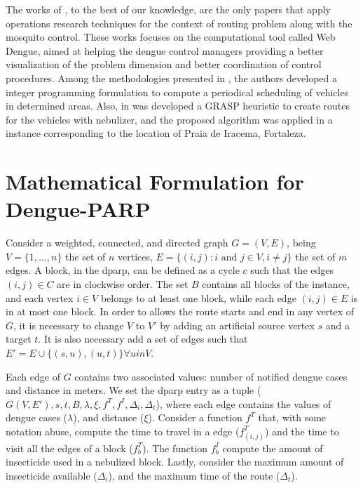 \documentclass[a4paper,11pt]{article}
\begin{document}
The works of \cite{negreiros:2008,negreiros:2011,negreiros-2020}, to the best of
our knowledge, are the only papers that apply operations research techniques for
the context  of routing  problem along  with the  mosquito control.  These works
focuses on the computational tool called Web Dengue, aimed at helping the dengue
control managers providing  a better visualization of the  problem dimension and
better coordination of control procedures.  Among the methodologies presented in
\cite{negreiros:2008,negreiros:2011},   the   authors    developed   a   integer
programming  formulation  to compute  a  periodical  scheduling of  vehicles  in
determined areas. Also, in \cite{negreiros:2011} was developed a GRASP heuristic
to create routes for the vehicles with nebulizer, and the proposed algorithm was
applied  in a  instance  corresponding  to the  location  of  Praia de  Iracema,
Fortaleza.

\section{Mathematical Formulation for Dengue-PARP} \label{sec:formulation}

Consider a weighted, connected, and directed graph $G = (V, E)$, being $V = \{1,
\dots, n\}$ the  set of $n$ vertices, $E =  \{(i, j): i \text{ and }  j \in V, i
\neq j\}$ the set of $m$ edges. A block, in the \gls{dparp}, can be defined as a
cycle $c$ such that the edges $(i, j) \in C$ are in clockwise order. The set $B$
contains all  blocks of the instance,  and each vertex  $i \in V$ belongs  to at
least one  block, while each  edge $(i, j)  \in E$ is in  at most one  block. In
order to allows the  route starts and end in any vertex of  $G$, it is necessary
to change  $V$ to $V'$ by  adding an artificial  source vertex $s$ and  a target
$t$. It is  also necessary add a set of  edges such that $E' = E  \cup \{(s, u),
(u, t)\} \forall u in V$.

Each edge of $G$ contains two associated values: number of notified dengue cases
and distance in meters.  We set the \gls{dparp} entry as a  tuple ($G(V, E'), s,
t, B, \lambda, \xi, f^T, f^I, \Delta_i, \Delta_t$), where each edge contains the
values of  dengue cases ($\lambda$),  and distance ($\xi$). Consider  a function
$f^T$ that,  with some  notation abuse,  compute the  time to  travel in  a edge
($f^T_{(i, j)}$) and the  time to visit all the edges of  a block ($f^T_b$). The
function $f^I_b$  compute the amount of  insecticide used in a  nebulized block.
Lastly, consider the  maximum amount of insecticide  available ($\Delta_i$), and
the maximum time of the route ($\Delta_t$).
\end{document}
